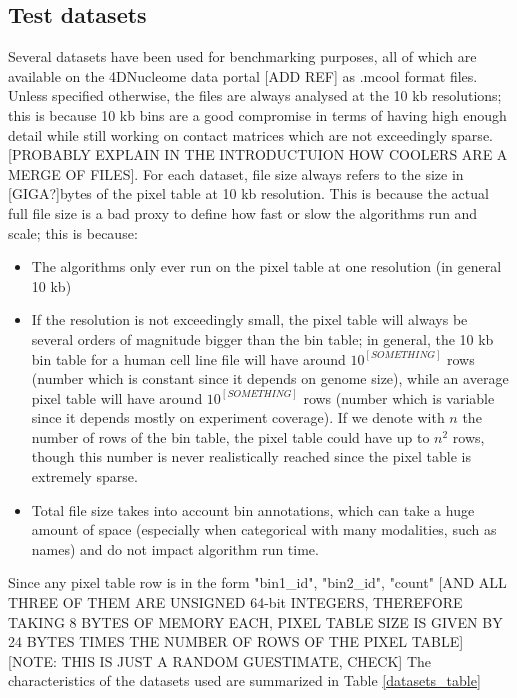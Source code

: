 \subsection{Test datasets}
Several datasets have been used for benchmarking purposes, all of which are available on the 4DNucleome data portal [ADD REF] as .mcool format files. Unless specified otherwise, the files are always analysed at the 10 kb resolutions; this is because 10 kb bins are a good compromise in terms of having high enough detail while still working on contact matrices which are not exceedingly sparse. [PROBABLY EXPLAIN IN THE INTRODUCTUION HOW COOLERS ARE A MERGE OF FILES]. 
For each dataset, file size always refers to the size in [GIGA?]bytes of the pixel table at 10 kb resolution. This is because the actual full file size is a bad proxy to define how fast or slow the algorithms run and scale; this is because: 
\begin{itemize}\tightlist
  \item The algorithms only ever run on the pixel table at one resolution (in general 10 kb)
  \item If the resolution is not exceedingly small, the pixel table will always be several orders of magnitude bigger than the bin table; in general, the 10 kb bin table for a human cell line file will have around $10^[SOMETHING]$ rows (number which is constant since it depends on genome size), while an average pixel table will have around $10^[SOMETHING]$ rows (number which is variable since it depends mostly on experiment coverage). If we denote with $n$ the number of rows of the bin table, the pixel table could have up to $n^2$ rows, though this number is never realistically reached since the pixel table is extremely sparse.
  \item Total file size takes into account bin annotations, which can take a huge amount of space (especially when categorical with many modalities, such as names) and do not impact algorithm run time.
\end{itemize}
Since any pixel table row is in the form "bin1\_id", "bin2\_id", "count" [AND ALL THREE OF THEM ARE UNSIGNED 64-bit INTEGERS, THEREFORE TAKING 8 BYTES OF MEMORY EACH, PIXEL TABLE SIZE IS GIVEN BY 24 BYTES TIMES THE NUMBER OF ROWS OF THE PIXEL TABLE][NOTE: THIS IS JUST A RANDOM GUESTIMATE, CHECK]
The characteristics of the datasets used are summarized in Table \ref{datasets_table}


